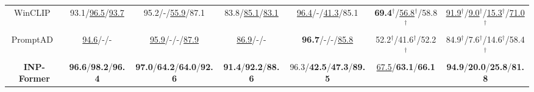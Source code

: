 \documentclass[letterpaper]{article} %
\begin{document}
\begin{table*}[]
{{\begin{tabular}{c|cccccc}
WinCLIP~\cite{WinClip}             & 93.1/\underline{96.5}/\underline{93.7} & \multicolumn{1}{c|}{95.2/-/\underline{55.9}/87.1}                            & 83.8/\underline{85.1}/\underline{83.1} & \multicolumn{1}{c|}{\underline{96.4}/-/\underline{41.3}/85.1}                            & \textbf{69.4}$^\dagger$/\underline{56.8}$^\dagger$/58.8$^\dagger$ & \underline{91.9}$^\dagger$/\underline{9.0}$^\dagger$/\underline{15.3}$^\dagger$/\underline{71.0}$^\dagger$  \\
PromptAD~\cite{PromptAD}            & \underline{94.6}/-/-       & \multicolumn{1}{c|}{\underline{95.9}/-/-/\underline{87.9}}                               & \underline{86.9}/-/-       & \multicolumn{1}{c|}{\textbf{96.7}/-/-/\underline{85.8}}                               & 52.2$^\dagger$/41.6$^\dagger$/52.2$^\dagger$ & 84.9$^\dagger$/7.6$^\dagger$/14.6$^\dagger$/58.4$^\dagger$  \\ \midrule
\rowcolor{Light} 
\textbf{INP-Former} & \textbf{96.6}/\textbf{98.2}/\textbf{96.4} & \multicolumn{1}{c|}{\cellcolor{Light}\textbf{97.0}/\textbf{64.2}/\textbf{64.0}/\textbf{92.6}} & \textbf{91.4}/\textbf{92.2}/\textbf{88.6} & \multicolumn{1}{c|}{\cellcolor{Light}96.3/\textbf{42.5}/\textbf{47.3}/\textbf{89.5}} & \underline{67.5}/\textbf{63.1}/\textbf{66.1} & \textbf{94.9}/\textbf{20.0}/\textbf{25.8}/\textbf{81.8} \\ \bottomrule[1.5pt]
\end{tabular}}}
\end{table*}
\end{document}
